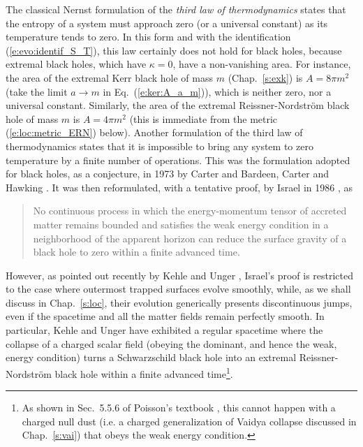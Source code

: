 The classical Nernst formulation of the \emph{third law of thermodynamics}
states that the entropy of a system must approach zero (or a universal constant)
as its temperature tends to zero. In this form and with the identification (\ref{e:evo:identif_S_T}), this law certainly does not hold for black holes, because
extremal black holes, which have $\kappa=0$, have a non-vanishing area. For
instance, the area of the extremal Kerr black hole of mass $m$ (Chap.~\ref{s:exk}) is
$A = 8\pi m^2$ (take the limit $a\to m$ in Eq.~(\ref{e:ker:A_a_m})),
which is neither zero, nor a universal constant. Similarly, the area of
the extremal Reissner-Nordström black hole of mass $m$ is $A = 4\pi m^2$
(this is immediate from the metric (\ref{e:loc:metric_ERN}) below).
Another formulation of the third law of thermodynamics states that it is impossible to bring any
system to zero temperature by a finite number of operations. This was the formulation adopted
for black holes, as a conjecture, in 1973 by Carter \cite{Carte73b} and Bardeen, Carter and Hawking \cite{BardeCH73}.
It was then reformulated, with a tentative proof, by Israel in 1986 \cite{Israe86b}, as
\begin{quote}
No continuous process in which the energy-momentum tensor of accreted matter remains
bounded and satisfies the weak energy
condition in a neighborhood of the apparent
horizon can reduce the surface gravity of a black hole to zero
within a finite advanced time.
\end{quote}
However, as pointed out recently by Kehle and Unger \cite{KehleU23}, Israel's proof
is restricted to the case where outermost trapped surfaces evolve smoothly, while, as we shall discuss in Chap.~\ref{s:loc},
their evolution generically presents discontinuous jumps, even if the spacetime
and all the matter fields remain perfectly smooth. In particular, Kehle and Unger \cite{KehleU23} have exhibited a regular spacetime where the collapse of a charged scalar field (obeying the dominant, and hence the weak, energy condition) turns a Schwarzschild black hole
into an extremal Reissner-Nordström black hole within a finite advanced time\footnote{As shown
in Sec.~5.5.6 of Poisson's textbook \cite{Poiss04}, this cannot happen with a charged null dust
(i.e. a charged generalization of Vaidya collapse discussed in Chap.~\ref{s:vai}) that obeys
the weak energy condition.}.

